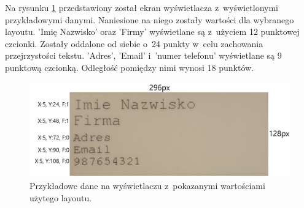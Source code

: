 \documentclass[a4paper,12pt, twoside]{article}
\begin{document}
    	Na rysunku \ref{fig:sampleLayout} przedstawiony został ekran wyświetlacza z~wyświetlonymi przykładowymi danymi. Naniesione na niego zostały wartości dla wybranego layoutu. 'Imię Nazwisko' oraz  'Firmy' wyświetlane są z~użyciem 12 punktowej czcionki. Zostały oddalone od siebie o~24 punkty w~celu zachowania przejrzystości tekstu. 'Adres', 'Email' i~'numer telefonu' wyświetlane są 9 punktową czcionką. Odległość pomiędzy nimi wynosi 18 punktów. 
    	\begin{figure}[H]
    	        \centering
    			\includegraphics[width=13cm]{images/wygladlayout.png}
    			\caption{Przykładowe dane na wyświetlaczu z~pokazanymi wartościami użytego layoutu.}
                \label{fig:sampleLayout}
    	\end{figure}
    	
\end{document}
